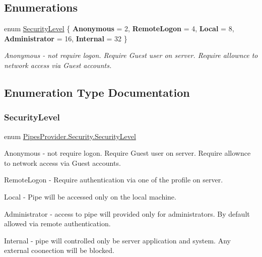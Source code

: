 \subsection*{Enumerations}
\begin{DoxyCompactItemize}
\item 
enum \mbox{\hyperlink{namespace_pipes_provider_1_1_security_a1a6020eca1c661a6f7140e8260502d7e}{Security\+Level}} \{ \newline
{\bfseries Anonymous} = 2, 
{\bfseries Remote\+Logon} = 4, 
{\bfseries Local} = 8, 
{\bfseries Administrator} = 16, 
\newline
{\bfseries Internal} = 32
 \}
\begin{DoxyCompactList}\small\item\em Anonymous -\/ not require logon. Require Guest user on server. Require allownce to network access via Guest accounts. \end{DoxyCompactList}\end{DoxyCompactItemize}


\subsection{Enumeration Type Documentation}
\mbox{\label{namespace_pipes_provider_1_1_security_a1a6020eca1c661a6f7140e8260502d7e}} 
\subsubsection{\texorpdfstring{Security\+Level}{SecurityLevel}}
{\footnotesize\ttfamily enum \mbox{\hyperlink{namespace_pipes_provider_1_1_security_a1a6020eca1c661a6f7140e8260502d7e}{Pipes\+Provider.\+Security.\+Security\+Level}}\hspace{0.3cm}{\ttfamily [strong]}}



Anonymous -\/ not require logon. Require Guest user on server. Require allownce to network access via Guest accounts. 

Remote\+Logon -\/ Require authentication via one of the profile on server.

Local -\/ Pipe will be accessed only on the local machine.

Administrator -\/ access to pipe will provided only for administrators. By default allowed via remote authentication.

Internal -\/ pipe will controlled only be server application and system. Any external coonection will be blocked. 